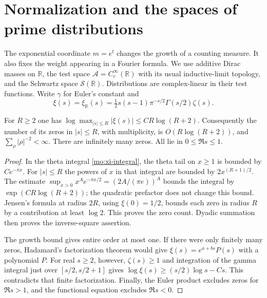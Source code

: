\section{Normalization and the spaces of prime distributions}
\label{v4-arith:pm:chapter}

The exponential coordinate $m=e^t$ changes the growth of a counting
measure. It also fixes the weight appearing in a Fourier formula.
We use additive Dirac masses on $\mathbb R$, the test space
$\mathscr A=C_c^\infty(\mathbb R)$ with its usual inductive-limit
topology, and the Schwartz space $\mathscr S(\mathbb R)$.
Distributions are complex-linear in their test functions.
Write $\gamma$ for Euler's constant and
\[
 \xi(s)=\xi_{\mathbb R}(s)
   =\tfrac12s(s-1)\pi^{-s/2}\Gamma(s/2)\zeta(s).
\]

\begin{lemma}
\label{v4-arith:pm:zero-count}
For $R\geq2$ one has
$\log\max_{|s|\leq R}|\xi(s)|\leq CR\log(R+2)$.
Consequently the number of its zeros in $|s|\leq R$, with
multiplicity, is $O(R\log(R+2))$, and
$\sum_\rho|\rho|^{-2}<\infty$.
There are infinitely many zeros. All lie in $0\leq\Re s\leq1$.
\end{lemma}
\begin{proof}
In the theta integral \eqref{mo:xi-integral}, the theta
tail on $x\geq1$ is bounded by $C e^{-\pi x}$. For $|s|\leq R$
the powers of $x$ in that integral are bounded by $2x^{(R+1)/2}$.
The estimate
$\sup_{x>0}x^A e^{-\pi x/2}=(2A/(\pi e))^A$
bounds the integral by $\exp(CR\log(R+2))$; the quadratic
prefactor does not change this bound. Jensen's formula at radius
$2R$, using $\xi(0)=1/2$, bounds each zero in radius $R$ by a
contribution at least $\log2$. This proves the zero count.
Dyadic summation then proves the inverse-square assertion.

The growth bound gives entire order at most one. If there were
only finitely many zeros, Hadamard's factorization theorem would
give $\xi(s)=e^{a+bs}P(s)$ with a polynomial $P$.
For real $s\geq2$, however, $\zeta(s)\geq1$ and integration of
the gamma integral just over $[s/2,s/2+1]$ gives
$\log\xi(s)\geq(s/2)\log s-Cs$. This contradicts that finite
factorization. Finally, the Euler product excludes zeros for
$\Re s>1$, and the functional equation excludes $\Re s<0$.
\end{proof}


